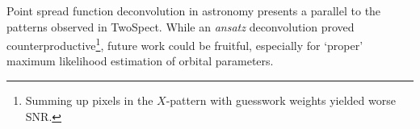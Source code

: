 
Point spread function deconvolution in astronomy presents a parallel to the patterns observed in TwoSpect.
While an \textit{ansatz} deconvolution proved counterproductive\footnote{Summing up pixels in the $X$-pattern with guesswork weights yielded worse SNR.}, future work could be fruitful, especially for `proper' maximum likelihood estimation of orbital parameters.



